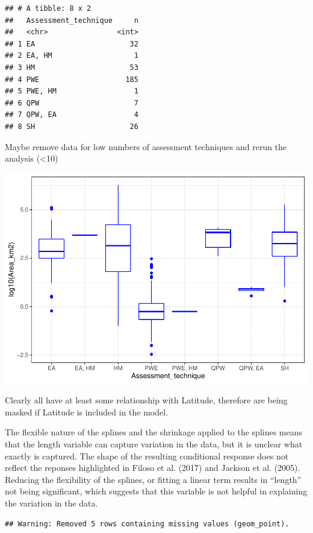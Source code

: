 \documentclass[]{elsarticle} %
\begin{document}
\begin{verbatim}
## # A tibble: 8 x 2
##   Assessment_technique     n
##   <chr>                <int>
## 1 EA                      32
## 2 EA, HM                   1
## 3 HM                      53
## 4 PWE                    185
## 5 PWE, HM                  1
## 6 QPW                      7
## 7 QPW, EA                  4
## 8 SH                      26
\end{verbatim}

Maybe remove data for low numbers of assessment techniques and rerun the
analysis (\textless10)

\includegraphics{Forest_and_Water_files/figure-latex/unnamed-chunk-22-1.pdf}

Clearly all have at least some relationship with Latitude, therefore are
being masked if Latitude is included in the model.

The flexible nature of the splines and the shrinkage applied to the
splines means that the length variable can capture variation in the
data, but it is unclear what exactly is captured. The shape of the
resulting conditional response does not reflect the reponses highlighted
in Filoso et al. (2017) and Jackson et al. (2005). Reducing the
flexibility of the splines, or fitting a linear term results in
``length'' not being significant, which suggests that this variable is
not helpful in explaining the variation in the data.

\begin{verbatim}
## Warning: Removed 5 rows containing missing values (geom_point).
\end{verbatim}
\end{document}
